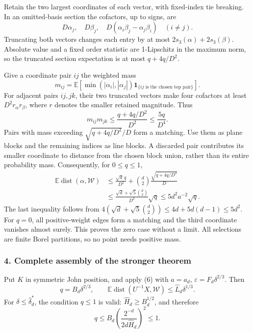 \documentclass[
  11pt,
]{article}
\begin{document}
Retain the two largest coordinates of each vector, with fixed-index tie
breaking. In an omitted-basis section the cofactors, up to signs, are \[
D\alpha_j,\quad D\beta_j,\quad
D(\alpha_i\beta_j-\alpha_j\beta_i)\quad(i\ne j).
\] Truncating both vectors changes each entry by at most
\(2s_3(\alpha)+2s_3(\beta)\). Absolute value and a fixed order statistic
are 1-Lipschitz in the maximum norm, so the truncated section
expectation is at most \(q+4q/D^2\).

Give a coordinate pair \(ij\) the weighted mass \[
m_{ij}=\mathbb E\left[
\min(|\alpha_i|,|\alpha_j|)
\mathbf1_{\{ij\text{ is the chosen top pair}\}}\right].
\] For adjacent pairs \(ij,jk\), their two truncated vectors make four
cofactors at least \(D^2r_\alpha r_\beta\), where \(r\) denotes the
smaller retained magnitude. Thus \[
m_{ij}m_{jk}\le\frac{q+4q/D^2}{D^2}\le\frac{5q}{D^4}.       \tag{5}
\] Pairs with mass exceeding \(\sqrt{q+4q/D^2}/D\) form a matching. Use
them as plane blocks and the remaining indices as line blocks. A
discarded pair contributes its smaller coordinate to distance from the
chosen block union, rather than its entire probability mass.
Consequently, for \(0\le q\le1\), \[
\begin{aligned}
\mathbb E\operatorname{dist}(\alpha,\mathcal W)
&\le\frac{\sqrt d\,q}{D^2}
 +\binom d2\frac{\sqrt{q+4q/D^2}}D\\
&\le\frac{\sqrt d+\sqrt5\binom d2}{D^2}\sqrt q
\le5d^2a^{-2}\sqrt q.                                     
\end{aligned}
\tag{6}
\] The last inequality follows from
\(4(\sqrt d+\sqrt5\binom d2)\le4d+5d(d-1)\le5d^2\). For \(q=0\), all
positive-weight edges form a matching and the third coordinate vanishes
almost surely. This proves the zero case without a limit. All selections
are finite Borel partitions, so no point needs positive mass.

\subsubsection{4. Complete assembly of the stronger
theorem}\label{complete-assembly-of-the-stronger-theorem}

Put \(K\) in symmetric John position, and apply (6) with \(a=a_d\),
\(\varepsilon=F_d\delta^{2/3}\). Then \[
q=B_d\delta^{2/3},\qquad
\mathbb E\operatorname{dist}(U^{-1}X,\mathcal W)
\le\widehat L_d\delta^{1/3}.                               \tag{7}
\] For \(\delta\le\widehat\delta_d^*\), the condition \(q\le1\) is
valid: \(\widehat H_d\ge B_d^{1/2}\), and therefore \[
q\le B_d\left(\frac{2^{-d}}{2d\widehat H_d}\right)^2\le1.
\]
\end{document}
